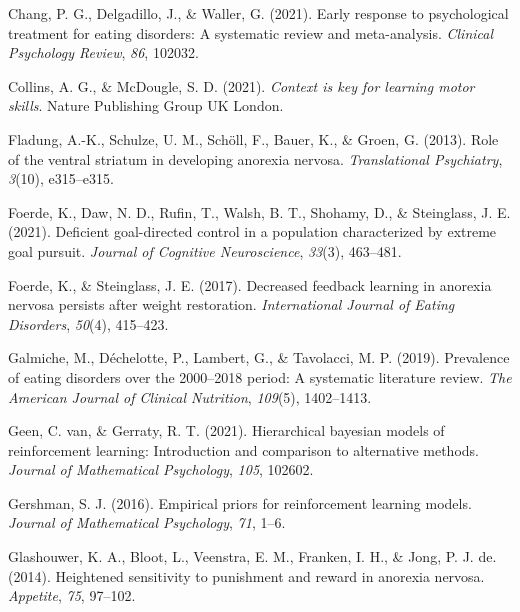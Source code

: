 \documentclass[
  man,floatsintext]{apa6}
\newlength{\cslhangindent}
\newlength{\cslentryspacingunit} %
\newenvironment{CSLReferences}[2] %
 {%
  \setlength{\parindent}{0pt}
  \ifodd #1
  \let\oldpar\par
  \def\par{\hangindent=\cslhangindent\oldpar}
  \fi
  \setlength{\parskip}{#2\cslentryspacingunit}
 }%
 {}
\begin{document}
\begin{CSLReferences}{1}{0}
\leavevmode{}%
Chang, P. G., Delgadillo, J., \& Waller, G. (2021). Early response to psychological treatment for eating disorders: A systematic review and meta-analysis. \emph{Clinical Psychology Review}, \emph{86}, 102032.

\leavevmode{}%
Collins, A. G., \& McDougle, S. D. (2021). \emph{Context is key for learning motor skills}. Nature Publishing Group UK London.

\leavevmode{}%
Fladung, A.-K., Schulze, U. M., Schöll, F., Bauer, K., \& Groen, G. (2013). Role of the ventral striatum in developing anorexia nervosa. \emph{Translational Psychiatry}, \emph{3}(10), e315--e315.

\leavevmode{}%
Foerde, K., Daw, N. D., Rufin, T., Walsh, B. T., Shohamy, D., \& Steinglass, J. E. (2021). Deficient goal-directed control in a population characterized by extreme goal pursuit. \emph{Journal of Cognitive Neuroscience}, \emph{33}(3), 463--481.

\leavevmode{}%
Foerde, K., \& Steinglass, J. E. (2017). Decreased feedback learning in anorexia nervosa persists after weight restoration. \emph{International Journal of Eating Disorders}, \emph{50}(4), 415--423.

\leavevmode{}%
Galmiche, M., Déchelotte, P., Lambert, G., \& Tavolacci, M. P. (2019). Prevalence of eating disorders over the 2000--2018 period: A systematic literature review. \emph{The American Journal of Clinical Nutrition}, \emph{109}(5), 1402--1413.

\leavevmode{}%
Geen, C. van, \& Gerraty, R. T. (2021). Hierarchical bayesian models of reinforcement learning: Introduction and comparison to alternative methods. \emph{Journal of Mathematical Psychology}, \emph{105}, 102602.

\leavevmode{}%
Gershman, S. J. (2016). Empirical priors for reinforcement learning models. \emph{Journal of Mathematical Psychology}, \emph{71}, 1--6.

\leavevmode{}%
Glashouwer, K. A., Bloot, L., Veenstra, E. M., Franken, I. H., \& Jong, P. J. de. (2014). Heightened sensitivity to punishment and reward in anorexia nervosa. \emph{Appetite}, \emph{75}, 97--102.


\end{CSLReferences}
\end{document}
